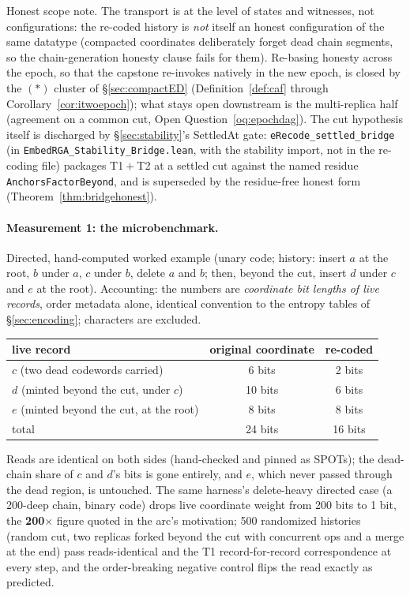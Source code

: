 \documentclass[11pt]{article}
\newcommand{\lean}[1]{\texttt{#1}}
\newcommand{\code}[1]{\texttt{#1}}
\begin{document}
\noindent Honest scope note. The transport is at the level of states
and witnesses, not configurations: the re-coded history is \emph{not}
itself an honest configuration of the same datatype (compacted
coordinates deliberately forget dead chain segments, so the
chain-generation honesty clause fails for them). Re-basing honesty
across the epoch, so that the capstone re-invokes natively in the new
epoch, is closed by the $(\ast)$ cluster of \S\ref{sec:compactED}
(Definition~\ref{def:caf} through Corollary~\ref{cor:itwoepoch});
what stays open downstream is the multi-replica half (agreement on a
common cut, Open Question~\ref{oq:epochdag}). The cut hypothesis
itself is discharged by \S\ref{sec:stability}'s SettledAt gate:
\lean{eRecode\_settled\_bridge} (in
\code{EmbedRGA\_Stability\_Bridge.lean}, with the stability import,
not in the re-coding file) packages T1${}+{}$T2 at a settled cut
against the named residue \lean{AnchorsFactorBeyond}, and is
superseded by the residue-free honest form
(Theorem~\ref{thm:bridgehonest}).

\paragraph{Measurement 1: the microbenchmark.} Directed, hand-computed
worked example (unary code; history: insert $a$ at the root, $b$ under
$a$, $c$ under $b$, delete $a$ and $b$; then, beyond the cut, insert
$d$ under $c$ and $e$ at the root). Accounting: the numbers are
\emph{coordinate bit lengths of live records}, order metadata alone,
identical convention to the entropy tables of \S\ref{sec:encoding};
characters are excluded.

\begin{center}\small
\begin{tabular}{@{}lcc@{}}
\toprule
live record & original coordinate & re-coded \\
\midrule
$c$ (two dead codewords carried) & 6 bits & 2 bits \\
$d$ (minted beyond the cut, under $c$) & 10 bits & 6 bits \\
$e$ (minted beyond the cut, at the root) & 8 bits & 8 bits \\
\midrule
total & 24 bits & 16 bits \\
\bottomrule
\end{tabular}
\end{center}

\noindent Reads are identical on both sides (hand-checked and pinned as
SPOTs); the dead-chain share of $c$ and $d$'s bits is gone entirely,
and $e$, which never passed through the dead region, is untouched. The
same harness's delete-heavy directed case (a 200-deep chain, binary
code) drops live coordinate weight from 200 bits to 1 bit, the
\textbf{200$\times$} figure quoted in the arc's motivation; 500
randomized histories (random cut, two replicas forked beyond the cut
with concurrent ops and a merge at the end) pass reads-identical and
the T1 record-for-record correspondence at every step, and the
order-breaking negative control flips the read exactly as predicted.
\end{document}

